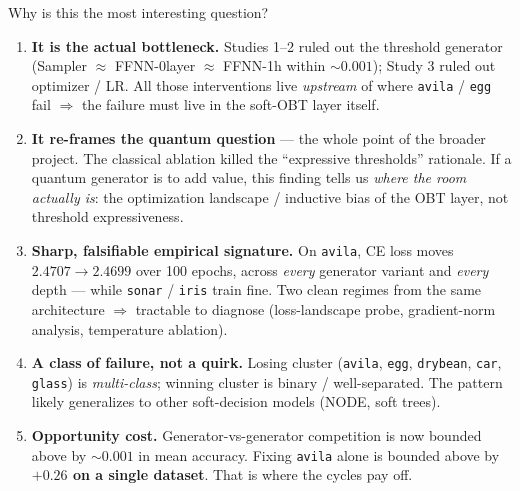 \documentclass[aspectratio=169,10pt]{beamer}
\newcommand{\dataset}[1]{\texttt{#1}}
\begin{document}
\begin{frame}{Why is this the most interesting question?}
  \begin{enumerate}
    \item \textbf{It is the actual bottleneck.} Studies 1--2 ruled out the threshold
          generator (Sampler $\approx$ FFNN-0layer $\approx$ FFNN-1h within $\sim 0.001$);
          Study 3 ruled out optimizer / LR. All those interventions live \emph{upstream}
          of where \dataset{avila} / \dataset{egg} fail $\Rightarrow$ the failure must live
          in the soft-OBT layer itself.
    \item \textbf{It re-frames the quantum question} --- the whole point of the broader project.
          The classical ablation killed the ``expressive thresholds'' rationale. If a quantum
          generator is to add value, this finding tells us \emph{where the room actually is}:
          the optimization landscape / inductive bias of the OBT layer, not threshold expressiveness.
    \item \textbf{Sharp, falsifiable empirical signature.} On \dataset{avila}, CE loss moves
          $2.4707 \rightarrow 2.4699$ over 100 epochs, across \emph{every} generator variant
          and \emph{every} depth --- while \dataset{sonar} / \dataset{iris} train fine.
          Two clean regimes from the same architecture $\Rightarrow$ tractable to diagnose
          (loss-landscape probe, gradient-norm analysis, temperature ablation).
    \item \textbf{A class of failure, not a quirk.} Losing cluster
          (\dataset{avila}, \dataset{egg}, \dataset{drybean}, \dataset{car}, \dataset{glass})
          is \emph{multi-class}; winning cluster is binary / well-separated. The pattern likely
          generalizes to other soft-decision models (NODE, soft trees).
    \item \textbf{Opportunity cost.} Generator-vs-generator competition is now bounded above
          by $\sim 0.001$ in mean accuracy. Fixing \dataset{avila} alone is bounded above by
          \textbf{$+0.26$ on a single dataset}. That is where the cycles pay off.
  \end{enumerate}
\end{frame}
\end{document}
